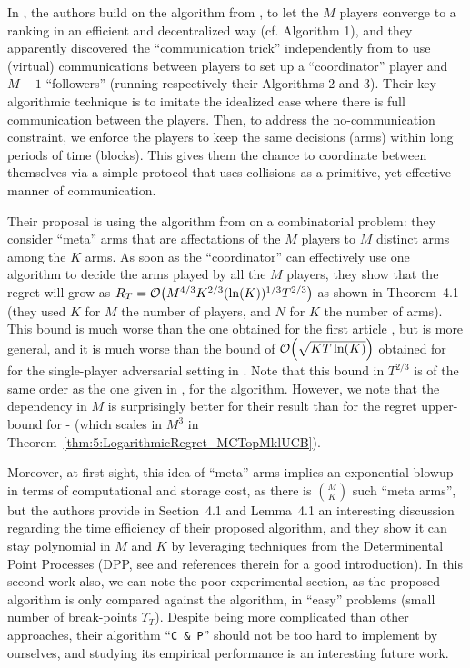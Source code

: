 In \cite{AlaturLevyKrause19}, the authors build on the \MusicalChair{} algorithm from \cite{Rosenski16}, to let the $M$ players converge to a ranking in an efficient and decentralized way (cf. Algorithm 1), and they apparently discovered the ``communication trick'' independently from \cite{BoursierPerchet18} to use (virtual) communications between players to set up a ``coordinator'' player and $M-1$ ``followers'' (running respectively their Algorithms 2 and 3).
%
Their key algorithmic technique is to imitate the idealized case where there is full communication between the players. Then, to address the no-communication constraint, we enforce the players to keep the same decisions (arms) within long periods of time (blocks). This gives them the chance to coordinate between themselves via a simple protocol that uses collisions as a primitive, yet effective manner of communication.

Their proposal is using the \ExpThree{} algorithm from \cite{Auer02NonStochastic} on a combinatorial problem: they consider ``meta'' arms that are affectations of the $M$ players to $M$ distinct arms among the $K$ arms.
As soon as the ``coordinator'' can effectively use one algorithm to decide the arms played by all the $M$ players, they show that the regret will grow as $R_T = \mathop{}\mathopen{}\mathcal{O}\mathopen{}\left(M^{4/3} K^{2/3} (\ln(K))^{1/3} T^{2/3}\right)$ as shown in Theorem~4.1
(they used $K$ for $M$ the number of players, and $N$ for $K$ the number of arms).
This bound is much worse than the one obtained for the first article \cite{WeiSrivastava18Distributed}, but is more general, and it is much worse than the bound of $\mathop{}\mathopen{}\mathcal{O}\mathopen{}\left(\sqrt{K T \ln(K)}\right)$ obtained for \ExpThree{} for the single-player adversarial setting in \cite{Auer02NonStochastic}.
Note that this bound in $T^{2/3}$ is of the same order as the one given in \cite{Avner15}, for the \MEGA{} algorithm.
However, we note that the dependency in $M$ is surprisingly better for their result than for the regret upper-bound for \MCTopM-\klUCB{} (which scales in $M^3$ in Theorem~\ref{thm:5:LogarithmicRegret_MCTopMklUCB}).

Moreover, at first sight, this idea of ``meta'' arms implies an exponential blowup in terms of computational and storage cost, as there is ${M \choose K}$ such ``meta arms'', but
the authors provide in Section~4.1 and Lemma~4.1 \cite{AlaturLevyKrause19} an interesting discussion regarding the time efficiency of their proposed algorithm, and they show it can stay polynomial in $M$ and $K$ by leveraging techniques from the Determinental Point Processes (DPP, see \cite{GaBaVa18} and references therein for a good introduction).
%
In this second work also, we can note the poor experimental section, as the proposed algorithm is only compared against the \MusicalChair{} algorithm, in ``easy'' problems (small number of break-points $\Upsilon_T$).
Despite being more complicated than other approaches, their algorithm ``\texttt{C \& P}'' should not be too hard to implement by ourselves, and studying its empirical performance is an interesting future work.


